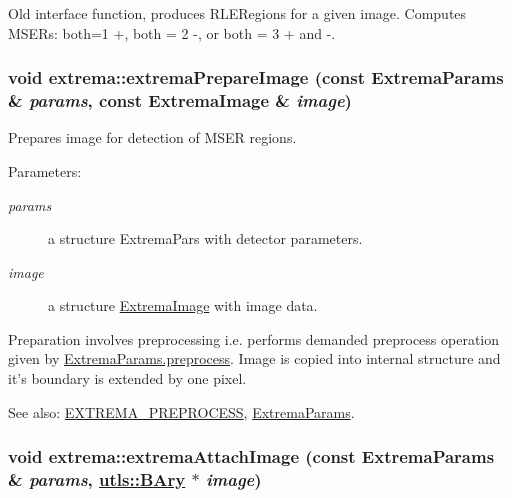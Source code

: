 Old interface function, produces RLERegions for a given image. Computes MSERs: both=1 +, both = 2 -, or both = 3 + and -. 

\hypertarget{namespaceextrema_49f2f15c6abeab32c237f6e72bbd616c}{
\subsubsection[extremaPrepareImage]{\setlength{\rightskip}{0pt plus 5cm}void extrema::extrema\-Prepare\-Image (const Extrema\-Params \& {\em params}, const Extrema\-Image \& {\em image})}}
\label{namespaceextrema_49f2f15c6abeab32c237f6e72bbd616c}


Prepares image for detection of MSER regions. 

\begin{Desc}
\item[Parameters:]
\begin{description}
\item[{\em params}]a structure Extrema\-Pars with detector parameters. \item[{\em image}]a structure \hyperlink{structextrema_1_1ExtremaImage}{Extrema\-Image} with image data.\end{description}
\end{Desc}
Preparation involves preprocessing i.e. performs demanded preprocess operation given by \hyperlink{structextrema_1_1ExtremaParams_9fae9c34ce341fdc55f32b100155394f}{Extrema\-Params.preprocess}. Image is copied into internal structure and it's boundary is extended by one pixel. \begin{Desc}
\item[See also:]\hyperlink{namespaceextrema_837b46455687e9080322d02a03574dab}{EXTREMA\_\-PREPROCESS}, \hyperlink{structextrema_1_1ExtremaParams}{Extrema\-Params}. \end{Desc}
\hypertarget{namespaceextrema_87df1ae98a67706398dc9648daa26a3e}{
\subsubsection[extremaAttachImage]{\setlength{\rightskip}{0pt plus 5cm}void extrema::extrema\-Attach\-Image (const Extrema\-Params \& {\em params}, \hyperlink{structutls_1_1Ary}{utls::BAry} $\ast$ {\em image})}}
\label{namespaceextrema_87df1ae98a67706398dc9648daa26a3e}


